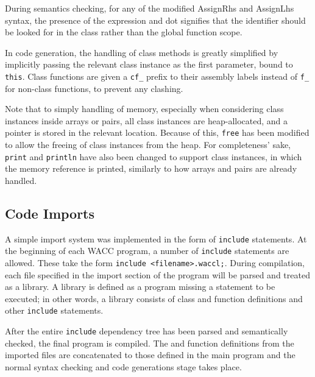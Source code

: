 \documentclass{article}
\begin{document}
During semantics checking, for any of the modified AssignRhs and AssignLhs syntax, the presence of the expression and dot signifies that the identifier should be looked for in the class rather than the global function scope.

In code generation, the handling of class methods is greatly simplified by implicitly passing the relevant class instance as the first parameter, bound to \texttt{this}. Class functions are given a \texttt{cf_} prefix to their assembly labels instead of \texttt{f_} for non-class functions, to prevent any clashing.

Note that to simply handling of memory, especially when considering class instances inside arrays or pairs, all class instances are heap-allocated, and a pointer is stored in the relevant location. Because of this, \texttt{free} has been modified to allow the freeing of class instances from the heap. For completeness' sake, \texttt{print} and \texttt{println} have also been changed to support class instances, in which the memory reference is printed, similarly to how arrays and pairs are already handled.

\subsection{Code Imports}
A simple import system was implemented in the form of \texttt{include} statements. At the beginning of each WACC program, a number of \texttt{include} statements are allowed. These take the form \texttt{include <filename>.waccl;}. During compilation, each file specified in the import section of the program will be parsed and treated as a library. A library is defined as a program missing a statement to be executed; in other words, a library consists of class and function definitions and other \texttt{include} statements.

After the entire \texttt{include} dependency tree has been parsed and semantically checked, the final program is compiled. The and function definitions from the imported files are concatenated to those defined in the main program and the normal syntax checking and code generations stage takes place.
\end{document}
